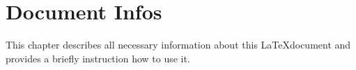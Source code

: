 \chapter{Document Infos}
This chapter describes all necessary information about this \LaTeX document and
provides a briefly instruction how to use it.













